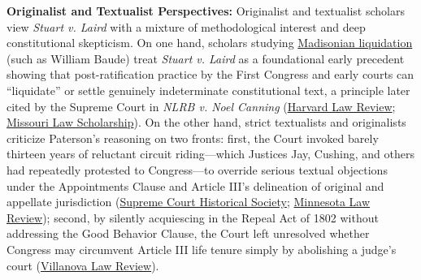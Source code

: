 \documentclass[12pt]{article}
\begin{document}
\textbf{Originalist and Textualist Perspectives:} Originalist and textualist scholars view \textit{Stuart v. Laird} with a mixture of methodological interest and deep constitutional skepticism. On one hand, scholars studying \href{https://review.law.stanford.edu/wp-content/uploads/sites/3/2019/01/Baude-71-Stan.-L.-Rev.-1-2019.pdf}{Madisonian liquidation} (such as William Baude) treat \textit{Stuart v. Laird} as a foundational early precedent showing that post-ratification practice by the First Congress and early courts can ``liquidate'' or settle genuinely indeterminate constitutional text, a principle later cited by the Supreme Court in \textit{NLRB v. Noel Canning} (\href{https://harvardlawreview.org/wp-content/uploads/2020/01/920-1009_Online.pdf}{Harvard Law Review}; \href{https://scholarship.law.missouri.edu/cgi/viewcontent.cgi?article=2335&context=facpubs}{Missouri Law Scholarship}). On the other hand, strict textualists and originalists criticize Paterson's reasoning on two fronts: first, the Court invoked barely thirteen years of reluctant circuit riding---which Justices Jay, Cushing, and others had repeatedly protested to Congress---to override serious textual objections under the Appointments Clause and Article III's delineation of original and appellate jurisdiction (\href{https://supremecourthistory.org/wp-content/uploads/2025/02/Volume-36-Number-3-2011.pdf}{Supreme Court Historical Society}; \href{https://scholarship.law.umn.edu/cgi/viewcontent.cgi?article=1032&context=mlr}{Minnesota Law Review}); second, by silently acquiescing in the Repeal Act of 1802 without addressing the Good Behavior Clause, the Court left unresolved whether Congress may circumvent Article III life tenure simply by abolishing a judge's court (\href{https://digitalcommons.law.villanova.edu/cgi/viewcontent.cgi?article=3118&context=vlr}{Villanova Law Review}).
\end{document}
